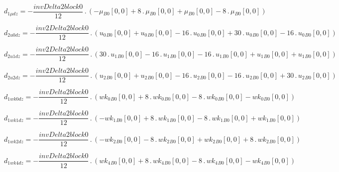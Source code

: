 \documentclass{article}
\begin{document}
\begin{dmath}d_{1 \mu dz} = - \frac{invDelta2block0}{12} \,.\, \left(- {\mu{_{B0}}}[{0,0}] + 8 \,.\, {\mu{_{B0}}}[{0,0}] + {\mu{_{B0}}}[{0,0}] - 8 \,.\, {\mu{_{B0}}}[{0,0}]\right)\end{dmath}

\begin{dmath}d_{2 u0 dz} = - \frac{inv2Delta2block0}{12} \,.\, \left({u_{0}{_{B0}}}[{0,0}] + {u_{0}{_{B0}}}[{0,0}] - 16 \,.\, {u_{0}{_{B0}}}[{0,0}] + 30 \,.\, {u_{0}{_{B0}}}[{0,0}] - 16 \,.\, {u_{0}{_{B0}}}[{0,0}]\right)\end{dmath}

\begin{dmath}d_{2 u1 dz} = - \frac{inv2Delta2block0}{12} \,.\, \left(30 \,.\, {u_{1}{_{B0}}}[{0,0}] - 16 \,.\, {u_{1}{_{B0}}}[{0,0}] - 16 \,.\, {u_{1}{_{B0}}}[{0,0}] + {u_{1}{_{B0}}}[{0,0}] + {u_{1}{_{B0}}}[{0,0}]\right)\end{dmath}

\begin{dmath}d_{2 u2 dz} = - \frac{inv2Delta2block0}{12} \,.\, \left({u_{2}{_{B0}}}[{0,0}] + {u_{2}{_{B0}}}[{0,0}] - 16 \,.\, {u_{2}{_{B0}}}[{0,0}] - 16 \,.\, {u_{2}{_{B0}}}[{0,0}] + 30 \,.\, {u_{2}{_{B0}}}[{0,0}]\right)\end{dmath}

\begin{dmath}d_{1 wk0 dz} = - \frac{invDelta2block0}{12} \,.\, \left({wk_{0}{_{B0}}}[{0,0}] + 8 \,.\, {wk_{0}{_{B0}}}[{0,0}] - 8 \,.\, {wk_{0}{_{B0}}}[{0,0}] - {wk_{0}{_{B0}}}[{0,0}]\right)\end{dmath}

\begin{dmath}d_{1 wk1 dz} = - \frac{invDelta2block0}{12} \,.\, \left(- {wk_{1}{_{B0}}}[{0,0}] + 8 \,.\, {wk_{1}{_{B0}}}[{0,0}] - 8 \,.\, {wk_{1}{_{B0}}}[{0,0}] + {wk_{1}{_{B0}}}[{0,0}]\right)\end{dmath}

\begin{dmath}d_{1 wk2 dz} = - \frac{invDelta2block0}{12} \,.\, \left(- {wk_{2}{_{B0}}}[{0,0}] - 8 \,.\, {wk_{2}{_{B0}}}[{0,0}] + {wk_{2}{_{B0}}}[{0,0}] + 8 \,.\, {wk_{2}{_{B0}}}[{0,0}]\right)\end{dmath}

\begin{dmath}d_{1 wk4 dz} = - \frac{invDelta2block0}{12} \,.\, \left({wk_{4}{_{B0}}}[{0,0}] + 8 \,.\, {wk_{4}{_{B0}}}[{0,0}] - 8 \,.\, {wk_{4}{_{B0}}}[{0,0}] - {wk_{4}{_{B0}}}[{0,0}]\right)\end{dmath}
\end{document}
